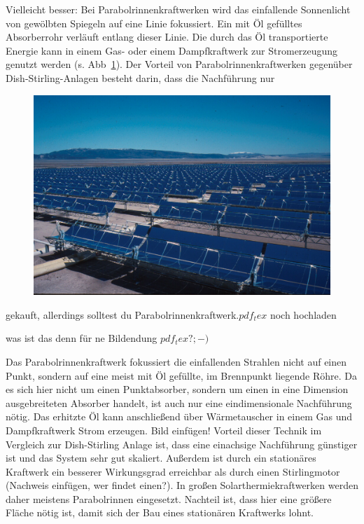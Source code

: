 \documentclass[fontsize=10pt,paper=a4,bibliography=totoc]{scrartcl}
\newcommand{\kai}[1]{{ \color{red} #1 }}
\newcommand{\felix}[1]{{ \color{green} #1}}
\newcommand{\maxim}[1]{{ \color{blue} #1}}
\begin{document}
\maxim{Vielleicht besser: Bei Parabolrinnenkraftwerken wird das einfallende Sonnenlicht von gewölbten Spiegeln auf eine Linie fokussiert. Ein mit Öl gefülltes Absorberrohr verläuft entlang dieser Linie. Die durch das Öl transportierte Energie kann in einem Gas- oder einem Dampfkraftwerk zur Stromerzeugung genutzt werden (s. Abb~\ref{pic:parabolrinnen}). Der Vorteil von Parabolrinnenkraftwerken gegenüber Dish-Stirling-Anlagen besteht darin, dass die Nachführung nur
\begin{figure}[h]
	\centering
	\def\svgwidth{.6\textwidth}
	\includegraphics[width=\textwidth]{Solar_Plant_kl}%
	
	\label{pic:parabolrinnen}
\end{figure}
}\hfill\newline\newline
\kai{gekauft, allerdings solltest du Parabolrinnenkraftwerk.$pdf_tex$ noch hochladen}

\felix{was ist das denn für ne Bildendung $pdf_tex? ;-)$}

Das Parabolrinnenkraftwerk fokussiert die einfallenden Strahlen nicht auf einen Punkt, sondern auf eine meist mit Öl gefüllte, im Brennpunkt liegende Röhre. Da es sich hier nicht um einen Punktabsorber, sondern um einen in eine Dimension ausgebreiteten Absorber handelt, ist auch nur eine eindimensionale Nachführung nötig. Das erhitzte Öl kann anschließend über Wärmetauscher in einem Gas und Dampfkraftwerk Strom erzeugen. Bild einfügen! Vorteil dieser Technik im Vergleich zur Dish-Stirling Anlage ist, dass eine einachsige Nachführung günstiger ist und das System sehr gut skaliert. Außerdem ist durch ein stationäres Kraftwerk ein besserer Wirkungsgrad erreichbar als durch einen Stirlingmotor
 (Nachweis einfügen, wer findet einen?). In großen Solarthermiekraftwerken werden daher meistens Parabolrinnen eingesetzt. Nachteil ist, dass hier eine größere Fläche nötig ist, damit sich der Bau eines stationären Kraftwerks lohnt.
\end{document}
